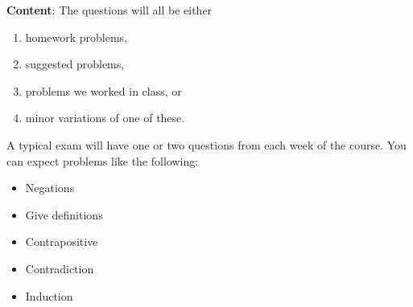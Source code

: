 \documentclass[12pt]{article}
\begin{document}
\noindent \textbf{Content}: The questions will all be either
\begin{enumerate}
\item homework problems,
\item suggested problems,
\item problems we worked in class, or
\item minor variations of one of these.
\end{enumerate}


A typical exam will have one or two questions from each week of the course. You can expect problems like the following:
\begin{itemize}
\item Negations
\item Give definitions
\item Contrapositive  
\item Contradiction
\item Induction
\end{itemize}






 
\end{document}
